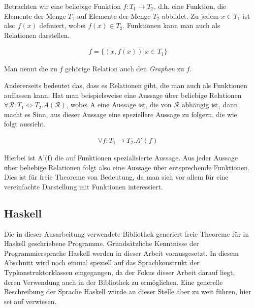 Betrachten wir eine beliebige Funktion $f : T_1 \rightarrow T_2$, d.h. eine Funktion, die Elemente der Menge $T_1$ auf
Elemente der Menge $T_2$ abbildet. Zu jedem $x \in T_1$ ist also $f(x)$ definiert, wobei $f(x) \in T_2$. Funktionen kann
man auch als Relationen darstellen.

\begin{align*}
f = \{ (x, f(x)) | x \in T_1 \}
\end{align*}

Man nennt die zu $f$ gehörige Relation auch den \textit{Graphen} zu $f$.

Andererseits bedeutet das, dass es Relationen gibt, die man auch als Funktionen auffassen kann. Hat man beispielsweise
eine Aussage über beliebige Relationen $\forall \mathcal{R} : T_1 \Leftrightarrow T_2 . A(\mathcal{R})$, wobei A eine
Aussage ist, die von $\mathcal{R}$ abhängig ist, dann macht es Sinn, aus dieser Aussage eine speziellere Aussage zu folgern,
die wie folgt aussieht.

\begin{align*}
\forall f : T_1 \rightarrow T_2 . A'(f)
\end{align*}

Hierbei ist A'(f) die auf Funktionen spezialisierte Aussage. Aus jeder Aussage über beliebige Relationen folgt also eine
Aussage über entsprechende Funktionen. Dies ist für freie Theoreme von Bedeutung, da man sich vor allem für eine vereinfachte
Darstellung mit Funktionen interessiert.


\subsection{Haskell}

Die in dieser Ausarbeitung verwendete Bibliothek generiert freie Theoreme für in Haskell geschriebene Programme. Grundsätzliche
Kenntnisse der Programmiersprache Haskell werden in dieser Arbeit vorausgesetzt. In diesem Abschnitt wird noch einmal
speziell auf das Sprachkonstrukt der Typkonstruktorklassen eingegangen, da der Fokus dieser Arbeit darauf liegt, deren Verwendung
auch in der Bibliothek zu ermöglichen.
Eine generelle Beschreibung der Sprache Haskell würde an dieser Stelle aber zu weit führen, hier sei auf \cite{haskell} verwiesen.



